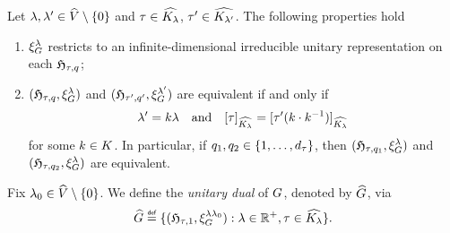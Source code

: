 \begin{proposition}
\label{proposition:unitary_dual}
    Let $\lambda, \lambda' \in {\widehat{V}} \setminus \{0\}$
    and $\tau \in {\widehat{{{K}_{\lambda}}}}$,
    $\tau' \in {\widehat{{{K}_{\lambda'}}}}$.
    The following properties hold
    \begin{enumerate}
        \item $\xi^{\lambda}_{G}$ restricts to an infinite-dimensional irreducible unitary representation on each $\mathfrak{H}_{\tau, q}$;
        \item $(\mathfrak{H}_{\tau, q}, \xi^{\lambda}_{G})$ and $(\mathfrak{H}_{\tau', q'}, \xi^{\lambda'}_{G})$ are equivalent if and only if
            \begin{align*}
                \lambda' = k \lambda \quad \text{and} \quad {{[\tau]}_{{\widehat{{{K}_{\lambda}}}}}} = {{[\tau'(k \cdot k^{-1})]}_{{\widehat{{{K}_{\lambda}}}}}}
            \end{align*}
            for some $k \in K$.
            In particular, if $q_1, q_2 \in \{1, \dots, {d_{\tau}}\}$,
            then $(\mathfrak{H}_{\tau, q_1}, \xi^{\lambda}_{G})$ and $(\mathfrak{H}_{\tau, q_2}, \xi^{\lambda}_{G})$ are equivalent.
    \end{enumerate}
\end{proposition}

\begin{definition}
\label{definition:unitary_dual_of_generalised_motion_group}
    Fix $\lambda_0 \in {\widehat{V}} \setminus \{0\}$.
    We define the \emph{unitary dual} of $G$, denoted by ${\widehat{G}}$, via
    \begin{align*}
        \dualGroup{\Group} \defeq \{ (\Hilbert{\tau}{1}, \Rep{\lambda \lambda_0}) : \lambda \in \R^+, \tau \in \dualGroup{\IsotropySubgroup{\CompactGroup}{\lambda}} \}.
    \end{align*}
\end{definition}

